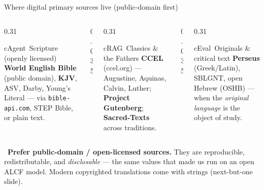 \begin{frame}{Where digital primary sources live (public-domain first)}
  \begin{columns}[t, totalwidth=\textwidth]
    \begin{column}{0.31\textwidth}
      \begin{featbox}{cAgent}{\faBookOpen\ Scripture (openly licensed)}
        \scriptsize \textbf{World English Bible} (public domain), \textbf{KJV}, ASV,
        Darby, Young's Literal --- via \texttt{bible-api.com}, STEP Bible, or plain text.
      \end{featbox}
    \end{column}
    \begin{column}{0.035\textwidth}\end{column}
    \begin{column}{0.31\textwidth}
      \begin{featbox}{cRAG}{\faLandmark\ Classics \& the Fathers}
        \scriptsize \textbf{CCEL} (ccel.org) --- Augustine, Aquinas, Calvin, Luther;
        \textbf{Project Gutenberg}; \textbf{Sacred-Texts} across traditions.
      \end{featbox}
    \end{column}
    \begin{column}{0.035\textwidth}\end{column}
    \begin{column}{0.31\textwidth}
      \begin{featbox}{cEval}{\faLanguage\ Originals \& critical text}
        \scriptsize \textbf{Perseus} (Greek/Latin), SBLGNT, open Hebrew (OSHB) ---
        when the \emph{original language} is the object of study.
      \end{featbox}
    \end{column}
  \end{columns}
  \vspace{10pt}
  \begin{calloutbox}[cRAG]
    \small\faInfoCircle\ \textbf{Prefer public-domain / open-licensed sources.} They are
    reproducible, redistributable, and \emph{disclosable} --- the same values that made
    us run on an open ALCF model. Modern copyrighted translations come with strings (next-but-one slide).
  \end{calloutbox}
\end{frame}

